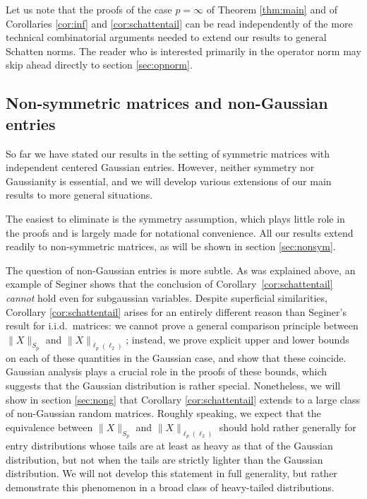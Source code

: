 \documentclass[10pt,reqno]{amsart}
\theoremstyle{definition}
\numberwithin{equation}{section}
\numberwithin{figure}{section}
\numberwithin{table}{section}
\begin{document}
Let us note that the proofs of the case $p=\infty$ of Theorem 
\ref{thm:main} and of Corollaries \ref{cor:inf} and \ref{cor:schattentail} 
can be read independently of the more technical combinatorial arguments 
needed to extend our results to general Schatten norms. The reader who is 
interested primarily in the operator norm may skip ahead directly to 
section \ref{sec:opnorm}.


\subsection{Non-symmetric matrices and non-Gaussian entries}

So far we have stated our results in the setting of symmetric matrices 
with independent centered Gaussian entries. However, neither 
symmetry nor Gaussianity is essential, and we will develop various 
extensions of our main results to more general situations.

The easiest to eliminate is the symmetry assumption, which plays little 
role in the proofs and is largely made for notational convenience. All our 
results extend readily to non-symmetric matrices, as will be shown in 
section \ref{sec:nonsym}.

The question of non-Gaussian entries is more subtle. As was explained 
above, an example of Seginer \cite[Theorem 3.2]{Seg00} shows that the 
conclusion of Corollary~\ref{cor:schattentail} \emph{cannot} hold even for 
subgaussian variables. Despite superficial similarities, Corollary 
\ref{cor:schattentail} arises for an entirely different reason than 
Seginer's result for i.i.d.\ matrices: we cannot prove a general 
comparison principle between $\|X\|_{S_p}$ and $\|X\|_{\ell_p(\ell_2)}$; 
instead, we prove explicit upper and lower bounds on each of these 
quantities in the Gaussian case, and show that these coincide. Gaussian 
analysis plays a crucial role in the proofs of these bounds, which 
suggests that the Gaussian distribution is rather special. Nonetheless, we 
will show in section \ref{sec:nong} that Corollary \ref{cor:schattentail} 
extends to a large class of non-Gaussian random matrices. Roughly 
speaking, we expect that the equivalence between $\|X\|_{S_p}$ and 
$\|X\|_{\ell_p(\ell_2)}$ should hold rather generally for entry 
distributions whose tails are at least as heavy as that of the Gaussian 
distribution, but not when the tails are strictly lighter than the 
Gaussian distribution. We will not develop this statement in full 
generality, but rather demonstrate this phenomenon in a broad class of 
heavy-tailed distributions.
\end{document}
